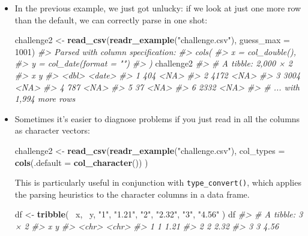 \documentclass[]{book}
\newenvironment{Shaded}{\begin{snugshade}}{\end{snugshade}}
\newcommand{\KeywordTok}[1]{\textcolor[rgb]{0.13,0.29,0.53}{\textbf{{#1}}}}
\newcommand{\DataTypeTok}[1]{\textcolor[rgb]{0.13,0.29,0.53}{{#1}}}
\newcommand{\DecValTok}[1]{\textcolor[rgb]{0.00,0.00,0.81}{{#1}}}
\newcommand{\StringTok}[1]{\textcolor[rgb]{0.31,0.60,0.02}{{#1}}}
\newcommand{\CommentTok}[1]{\textcolor[rgb]{0.56,0.35,0.01}{\textit{{#1}}}}
\newcommand{\NormalTok}[1]{{#1}}
\begin{document}
\begin{itemize}
\item
  In the previous example, we just got unlucky: if we look at just one
  more row than the default, we can correctly parse in one shot:

\begin{Shaded}
\begin{Highlighting}[]
\NormalTok{challenge2 <-}\StringTok{ }\KeywordTok{read_csv}\NormalTok{(}\KeywordTok{readr_example}\NormalTok{(}\StringTok{"challenge.csv"}\NormalTok{), }\DataTypeTok{guess_max =} \DecValTok{1001}\NormalTok{)}
\CommentTok{#> Parsed with column specification:}
\CommentTok{#> cols(}
\CommentTok{#>   x = col_double(),}
\CommentTok{#>   y = col_date(format = "")}
\CommentTok{#> )}
\NormalTok{challenge2}
\CommentTok{#> # A tibble: 2,000 × 2}
\CommentTok{#>       x      y}
\CommentTok{#>   <dbl> <date>}
\CommentTok{#> 1   404   <NA>}
\CommentTok{#> 2  4172   <NA>}
\CommentTok{#> 3  3004   <NA>}
\CommentTok{#> 4   787   <NA>}
\CommentTok{#> 5    37   <NA>}
\CommentTok{#> 6  2332   <NA>}
\CommentTok{#> # ... with 1,994 more rows}
\end{Highlighting}
\end{Shaded}
\item
  Sometimes it's easier to diagnose problems if you just read in all the
  columns as character vectors:

\begin{Shaded}
\begin{Highlighting}[]
\NormalTok{challenge2 <-}\StringTok{ }\KeywordTok{read_csv}\NormalTok{(}\KeywordTok{readr_example}\NormalTok{(}\StringTok{"challenge.csv"}\NormalTok{), }
  \DataTypeTok{col_types =} \KeywordTok{cols}\NormalTok{(}\DataTypeTok{.default =} \KeywordTok{col_character}\NormalTok{())}
\NormalTok{)}
\end{Highlighting}
\end{Shaded}

  This is particularly useful in conjunction with
  \texttt{type\_convert()}, which applies the parsing heuristics to the
  character columns in a data frame.

\begin{Shaded}
\begin{Highlighting}[]
\NormalTok{df <-}\StringTok{ }\KeywordTok{tribble}\NormalTok{(}
  \NormalTok{~x,  ~y,}
  \StringTok{"1"}\NormalTok{, }\StringTok{"1.21"}\NormalTok{,}
  \StringTok{"2"}\NormalTok{, }\StringTok{"2.32"}\NormalTok{,}
  \StringTok{"3"}\NormalTok{, }\StringTok{"4.56"}
\NormalTok{)}
\NormalTok{df}
\CommentTok{#> # A tibble: 3 × 2}
\CommentTok{#>       x     y}
\CommentTok{#>   <chr> <chr>}
\CommentTok{#> 1     1  1.21}
\CommentTok{#> 2     2  2.32}
\CommentTok{#> 3     3  4.56}


\end{Highlighting}
\end{Shaded}
\end{itemize}
\end{document}
